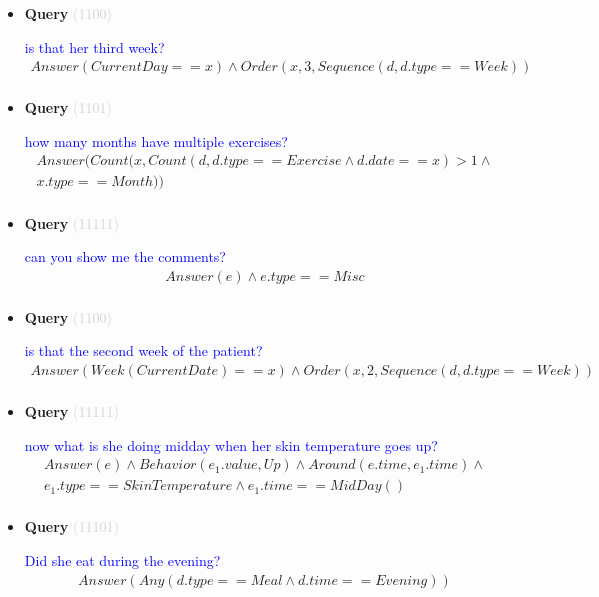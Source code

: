 \documentclass[11pt]{article}
\newcommand{\key}[1]{\textcolor{lightgray}{#1}}
\newcounter{CQuery}
\begin{document}
\begin{itemize}
\item
\textbf{Query\theCQuery} \key{(1100)} \addtocounter{CQuery}{1}
\textcolor{blue}{ is that her third week? }
\begin{multline*}
Answer(CurrentDay==x) \wedge Order(x, 3, Sequence(d, d.type==Week)) \\ 
\end{multline*}


\item
\textbf{Query\theCQuery} \key{(1101)} \addtocounter{CQuery}{1}
\textcolor{blue}{ how many months have multiple exercises? }
\begin{multline*}
Answer(Count(x, Count(d, d.type==Exercise \wedge d.date==x)>1 \wedge \\ 
x.type==Month)) \\ 
\end{multline*}


\item
\textbf{Query\theCQuery} \key{(11111)} \addtocounter{CQuery}{1}
\textcolor{blue}{ can you show me the comments? }
\begin{multline*}
Answer(e) \wedge e.type==Misc \\ 
\end{multline*}


\item
\textbf{Query\theCQuery} \key{(1100)} \addtocounter{CQuery}{1}
\textcolor{blue}{ is that the second week of the patient? }
\begin{multline*}
Answer(Week(CurrentDate)==x) \wedge Order(x, 2, Sequence(d, d.type==Week)) \\ 
\end{multline*}


\item
\textbf{Query\theCQuery} \key{(11111)} \addtocounter{CQuery}{1}
\textcolor{blue}{ now what is she doing midday when her skin temperature goes up? }
\begin{multline*}
Answer(e) \wedge Behavior(e_1.value, Up) \wedge Around(e.time, e_1.time) \wedge \\ 
e_1.type==SkinTemperature \wedge e_1.time==MidDay() \\ 
\end{multline*}


\item
\textbf{Query\theCQuery} \key{(11101)} \addtocounter{CQuery}{1}
\textcolor{blue}{ Did she eat during the evening? }
\begin{multline*}
Answer(Any(d.type==Meal \wedge d.time==Evening)) \\ 
\end{multline*}



\end{itemize}
\end{document}
